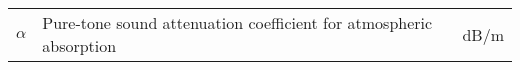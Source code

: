 \begin{longtable}[l]{p{50pt} p{300pt} p{50pt}}
$\alpha$    &   Pure-tone sound attenuation coefficient for atmospheric absorption  &   dB/m \\


\end{longtable}

